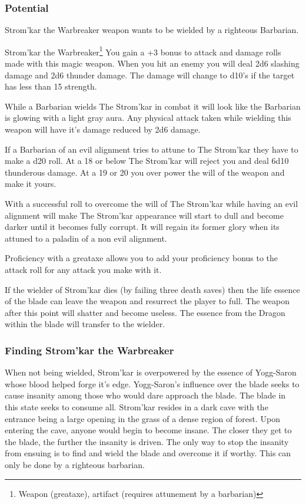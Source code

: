 \subsubsection{Potential}

Strom'kar the Warbreaker weapon wants to be wielded by a righteous Barbarian. 

\begin{commentbox}{Strom'kar the Warbreaker\footnote{Weapon (greataxe), artifact (requires attunement by a barbarian)}}	
	You gain a +3 bonus to attack and damage rolls made with this magic weapon. When you hit an enemy you will deal 2d6 slashing damage and 2d6 thunder damage. The damage will change to d10's if the target has less than 15 strength.
	
	While a Barbarian wields The Strom'kar in combat it will look like the Barbarian is glowing with a light gray aura. Any physical attack taken while wielding this weapon will have it's damage reduced by 2d6 damage.
	
	If a Barbarian of an evil alignment tries to attune to The Strom'kar they have to make a d20 roll. At a 18 or below The Strom'kar will reject you and deal 6d10 thunderous damage. At a 19 or 20 you over power the will of the weapon and make it yours.
	
	With a successful roll to overcome the will of The Strom'kar while having an evil alignment will make The Strom'kar appearance will start to dull and become darker until it becomes fully corrupt. It will regain its former glory when its attuned to a paladin of a non evil alignment.
	
	Proficiency with a greataxe allows you to add your proficiency bonus to the attack roll for any attack you make with it.
	
	If the wielder of Strom'kar dies (by failing three death saves) then the life essence of the blade can leave the weapon and resurrect the player to full. The weapon after this point will shatter and become useless. The essence from the Dragon within the blade will transfer to the wielder.
\end{commentbox}

\subsubsection{Finding Strom'kar the Warbreaker}

When not being wielded, Strom'kar is overpowered by the essence of Yogg-Saron whose blood helped forge it's edge. Yogg-Saron's influence over the blade seeks to cause insanity among those who would dare approach the blade. The blade in this state seeks to consume all. Strom'kar resides in a dark cave with the entrance being a large opening in the grass of a dense region of forest. Upon entering the cave, anyone would begin to become insane. The closer they get to the blade, the further the insanity is driven. The only way to stop the insanity from ensuing is to find and wield the blade and overcome it if worthy. This can only be done by a righteous barbarian. 

